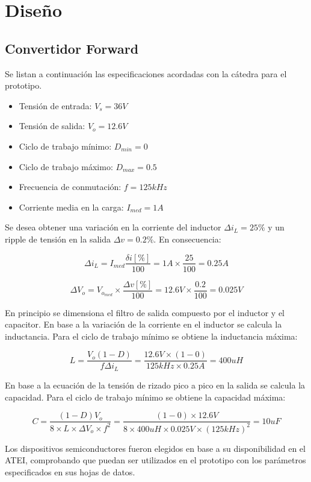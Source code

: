 \section{Diseño}

\subsection{Convertidor Forward}

Se listan a continuación las especificaciones acordadas con la cátedra para el prototipo.

\begin{itemize}
    \item Tensión de entrada: $V_s=36V$
    \item Tensión de salida: $V_o=12.6V$
    \item Ciclo de trabajo mínimo: $D_{min}=0$
    \item Ciclo de trabajo máximo: $D_{max}=0.5$
    \item Frecuencia de conmutación: $f=125kHz$
    \item Corriente media en la carga: $I_{med}=1A$
\end{itemize}

Se desea obtener una variación en la corriente del inductor $\Delta i_L=25\%$ y un ripple de tensión en la salida $\Delta v=0.2\%$.
En consecuencia:

$$ \Delta i_L=I_{med}\frac{\delta i[\%]}{100}=1A\times\frac{25}{100}=0.25A $$

$$ \Delta V_o=V_{o_{med}}\times\frac{\Delta v[\%]}{100}=12.6V\times\frac{0.2}{100}=0.025V $$

En principio se dimensiona el filtro de salida compuesto por el inductor y el capacitor. 
En base a la variación de la corriente en el inductor se calcula la inductancia.
Para el ciclo de trabajo mínimo se obtiene la inductancia máxima:

$$ L=\frac{V_o(1-D)}{f\Delta i_L}=\frac{12.6V\times(1-0)}{125kHz\times0.25A}=400uH $$

En base a la ecuación de la tensión de rizado pico a pico en la salida se calcula la capacidad.
Para el ciclo de trabajo mínimo se obtiene la capacidad máxima:

$$ C=\frac{(1-D)V_o}{8\times L\times\Delta V_o\times f^2}=\frac{(1-0)\times12.6V}{8\times400uH\times0.025V\times(125kHz)^2}=10uF $$

Los dispositivos semiconductores fueron elegidos en base a su disponibilidad en el ATEI,
comprobando que puedan ser utilizados en el prototipo con los parámetros especificados en sus hojas de datos.  

